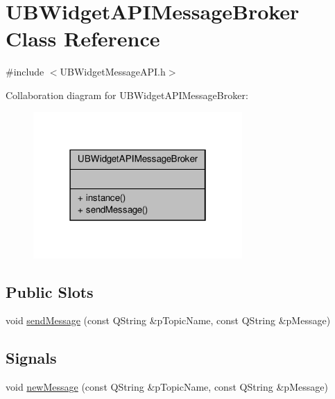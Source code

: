 \hypertarget{class_u_b_widget_a_p_i_message_broker}{\section{U\-B\-Widget\-A\-P\-I\-Message\-Broker Class Reference}
\label{d2/d5c/class_u_b_widget_a_p_i_message_broker}
}


{\ttfamily \#include $<$U\-B\-Widget\-Message\-A\-P\-I.\-h$>$}



Collaboration diagram for U\-B\-Widget\-A\-P\-I\-Message\-Broker\-:
\nopagebreak
\begin{figure}[H]
\begin{center}
\leavevmode
\includegraphics[width=226pt]{d5/da5/class_u_b_widget_a_p_i_message_broker__coll__graph}
\end{center}
\end{figure}
\subsection*{Public Slots}
\begin{DoxyCompactItemize}
\item 
void \hyperlink{class_u_b_widget_a_p_i_message_broker_abcefec69dc208159e89a6f53b834ad54}{send\-Message} (const Q\-String \&p\-Topic\-Name, const Q\-String \&p\-Message)
\end{DoxyCompactItemize}
\subsection*{Signals}
\begin{DoxyCompactItemize}
\item 
void \hyperlink{class_u_b_widget_a_p_i_message_broker_a3eb3aae947d7d867f2c3017a99afd0c9}{new\-Message} (const Q\-String \&p\-Topic\-Name, const Q\-String \&p\-Message)
\end{DoxyCompactItemize}

